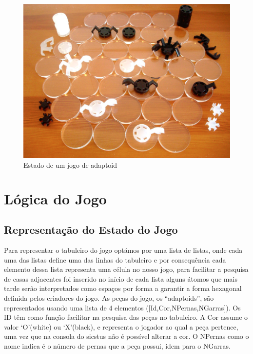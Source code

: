 \documentclass[a4paper]{article}
\begin{document}
\begin{figure}[h]
    \begin{center}
        \includegraphics[scale=0.5]{jogoDecorrer}
        \caption{Estado de um jogo de adaptoid}
        \centering
    \end{center}
\end{figure}

\newpage
\section{Lógica do Jogo}

\subsection{Representação do Estado do Jogo}  Para representar o tabuleiro do jogo optámos por uma lista de listas, onde cada uma das listas define uma das linhas do tabuleiro e por consequência cada elemento dessa lista representa uma célula no nosso jogo,  para facilitar a pesquisa de casas adjacentes foi inserido no início de cada lista alguns átomos que mais tarde serão interpretados como espaços por forma a garantir a forma hexagonal definida pelos criadores do jogo. As peças do jogo, os “adaptoids”, são representados usando uma lista de 4 elementos ([Id,Cor,NPernas,NGarras]). Os ID têm como função facilitar na pesquisa das peças no tabuleiro. A Cor assume o valor ‘O’(white) ou ‘X’(black), e representa o jogador ao qual a peça pertence, uma vez que na consola do sicstus não é possível alterar a cor. O NPernas como o nome indica é o número de pernas que a peça possui, idem para o NGarras. 
\end{document}
